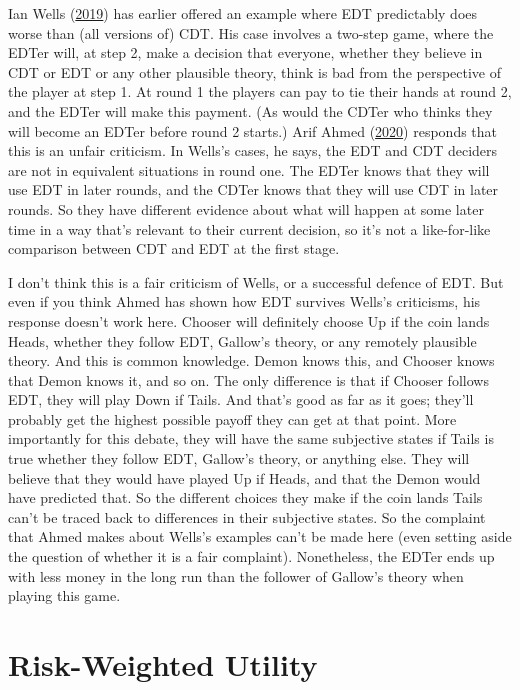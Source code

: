 \documentclass[
  12pt,
  letterpaper,
  DIV=11,
  numbers=noendperiod]{scrreprt}
\begin{document}
Ian Wells (\protect\hyperlink{ref-Wells2019}{2019}) has earlier offered
an example where EDT predictably does worse than (all versions of) CDT.
His case involves a two-step game, where the EDTer will, at step 2, make
a decision that everyone, whether they believe in CDT or EDT or any
other plausible theory, think is bad from the perspective of the player
at step 1. At round 1 the players can pay to tie their hands at round 2,
and the EDTer will make this payment. (As would the CDTer who thinks
they will become an EDTer before round 2 starts.) Arif Ahmed
(\protect\hyperlink{ref-Ahmed2020}{2020}) responds that this is an
unfair criticism. In Wells's cases, he says, the EDT and CDT deciders
are not in equivalent situations in round one. The EDTer knows that they
will use EDT in later rounds, and the CDTer knows that they will use CDT
in later rounds. So they have different evidence about what will happen
at some later time in a way that's relevant to their current decision,
so it's not a like-for-like comparison between CDT and EDT at the first
stage.

I don't think this is a fair criticism of Wells, or a successful defence
of EDT. But even if you think Ahmed has shown how EDT survives Wells's
criticisms, his response doesn't work here. Chooser will definitely
choose Up if the coin lands Heads, whether they follow EDT, Gallow's
theory, or any remotely plausible theory. And this is common knowledge.
Demon knows this, and Chooser knows that Demon knows it, and so on. The
only difference is that if Chooser follows EDT, they will play Down if
Tails. And that's good as far as it goes; they'll probably get the
highest possible payoff they can get at that point. More importantly for
this debate, they will have the same subjective states if Tails is true
whether they follow EDT, Gallow's theory, or anything else. They will
believe that they would have played Up if Heads, and that the Demon
would have predicted that. So the different choices they make if the
coin lands Tails can't be traced back to differences in their subjective
states. So the complaint that Ahmed makes about Wells's examples can't
be made here (even setting aside the question of whether it is a fair
complaint). Nonetheless, the EDTer ends up with less money in the long
run than the follower of Gallow's theory when playing this game.

\hypertarget{sec-buchak}{%
\chapter{Risk-Weighted Utility}\label{sec-buchak}}
\end{document}
